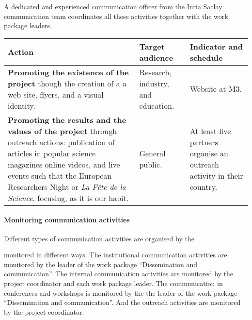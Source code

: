 A dedicated and experienced communication officer from the Inria Saclay
communication team coordinates all these activities together with the
work package leaders.

\begin{longtable}{|p{}|p{}|p{}|}
\hline
{\bf Action}
&
{\bf Target audience}
&
{\bf Indicator and schedule}
\\
\hline
{\bf Promoting the existence of the project}
though the creation of a a web site, flyers, and 
a visual identity. 
&
Research, industry, and education.
&
Website at M3.
\\
\hline
{\bf Promoting the results and the values of the project} through 
outreach actions: 
publication of articles in  popular science magazines
online videos, and live events such that the
European Researchers Night or {\em La Fête de la Science}, 
focusing, as it is our habit. 
&
General public.
&
At least five partners organise an outreach activity in their country.
\\
\hline
\end{longtable}

    \paragraph*{Monitoring communication activities}

Different types of communication activities are organised by the 


monitored in
different ways.  The institutional communication activities are
monitored by the leader of the work package ``Dissemination and
communication''. The internal communication activities are monitored
by the project coordinator and each work package leader. The communication
in conferences and workshops is monitored by the
the leader of the work package ``Dissemination and
communication''. And the outreach activities are monitored by the
project coordinator.

